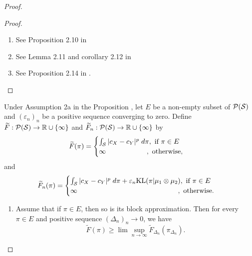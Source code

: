 \begin{proof}
\begin{proof}
\begin{enumerate}
        \item See Proposition 2.10 in \citep{Carlier17}
        \item See Lemma 2.11 and corollary 2.12 in \citep{Carlier17}
        \item See Proposition 2.14 in \citep{Carlier17}.
      \end{enumerate}
    \end{proof}
    \begin{lemma} \label{lemma:limsupinf}
      Under Assumption 2a in the Proposition ,
      let $E$ be a non-empty subset of $\mathcal P(\mathcal S)$ and $(\varepsilon_n)_n$ be a positive sequence converging to zero.
      Define $\widetilde{F}: \mathcal P(\mathcal S) \to \mathbb R \cup \{ \infty \}$ and
      $\widetilde{F}_n: \mathcal P(\mathcal S) \to \mathbb R \cup \{ \infty \}$ by
      \begin{equation}
        \widetilde{F}(\pi) =
        \begin{cases}
          \int_{\mathcal S} \vert c_X - c_Y \vert^p \; d\pi, \text{ if } \pi \in E \\
          \infty \;\;\;\;\;\;\;\;\;\;\;\;\;\;\;\;\;\;\;\;\; ,\text{ otherwise},
        \end{cases}
      \end{equation}
      and
      \begin{equation}
        \widetilde{F}_n(\pi) =
        \begin{cases}
          \int_{\mathcal S} \vert c_X - c_Y \vert^p \; d\pi + \varepsilon_n \text{KL}(\pi \vert \mu_1 \otimes \mu_2), \text{ if } \pi \in E \\
          \infty \;\;\;\;\;\;\;\;\;\;\;\;\;\;\;\;\;\;\;\;\;\;\;\;\;\;\;\;\;\;\;\;\;\;\;\;\;\;\;\;\;\;\;\;\;\;\;\;\;\;\;\; ,\text{ otherwise}.
        \end{cases}
      \end{equation}
      \begin{enumerate}
        \item Assume that if $\pi \in E$, then so is its block approximation. Then for every $\pi \in E$ and positive sequence $(\Delta_n)_n \to 0$, we have
        \begin{equation}
          \widetilde{F}(\pi) \geq \lim\sup_{n \to \infty} \widetilde{F}_{\Delta_n}(\pi_{\Delta_n}).
        \end{equation}


\end{enumerate}
\end{lemma}
\end{proof}
